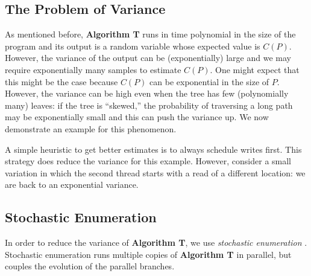 \subsection{The Problem of Variance}

As mentioned before, \textbf{Algorithm T} runs in time polynomial in the size of the program and its output is a random variable whose
expected value is $C(P)$.
However, the variance of the output can be (exponentially) large and we may require exponentially many samples
to estimate $C(P)$.
One might expect that this might be the case because $C(P)$ can be exponential in the size of $P$. However, the variance can be high even when the tree has few (polynomially many) leaves: if the tree is ``skewed,''
the probability of traversing a long path may be exponentially small and this can push the variance up. We now demonstrate an example for this phenomenon.




A simple heuristic to get better estimates is to always schedule writes first.
This strategy does reduce the variance for this example.
However, consider a small variation
in which the second thread starts with a read of a different location: we are back to an exponential variance.


\subsection{Stochastic Enumeration}
\label{sec:se}
In order to reduce the variance of \textbf{Algorithm T}, we use \emph{stochastic enumeration} \cite{rubinstein,vaisman2017}.
Stochastic enumeration runs multiple copies of \textbf{Algorithm T} in parallel, but couples the evolution of the parallel branches.

